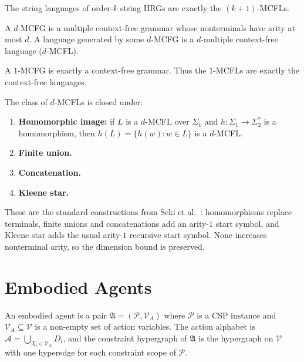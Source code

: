 \documentclass[runningheads]{llncs}
\begin{document}
\begin{theorem}\label{thm:hrg-mcfl}
The string languages of order-$k$ string HRGs are exactly the $(k{+}1)$-MCFLs.
\end{theorem}

\begin{definition}\label{def:dimension}
A $d$-MCFG is a multiple context-free grammar whose nonterminals have arity at most $d$. A language generated by some $d$-MCFG is a $d$-multiple context-free language ($d$-MCFL).
\end{definition}

\begin{remark}\label{rem:mcfg-cfg}
A $1$-MCFG is exactly a context-free grammar. Thus the $1$-MCFLs are exactly the context-free languages.
\end{remark}

\begin{lemma}\label{lem:mcfl-closure}
The class of $d$-MCFLs is closed under:
\begin{enumerate}[nosep,label=(\alph*)]
  \item\label{closure:hom} \textbf{Homomorphic image:} if $L$ is a $d$-MCFL over $\Sigma_1$ and $h\colon \Sigma_1 \to \Sigma_2^*$ is a homomorphism, then $h(L) = \{h(w) : w \in L\}$ is a $d$-MCFL.
  \item\label{closure:union} \textbf{Finite union.}
  \item\label{closure:concat} \textbf{Concatenation.}
  \item\label{closure:star} \textbf{Kleene star.}
\end{enumerate}
\end{lemma}

These are the standard constructions from Seki et al.~\cite{Seki91}: homomorphisms replace terminals, finite unions and concatenations add an arity-$1$ start symbol, and Kleene star adds the usual arity-$1$ recursive start symbol. None increases nonterminal arity, so the dimension bound is preserved.

\section{Embodied Agents}\label{sec:agent}

\begin{definition}\label{def:agent}
An embodied agent is a pair $\mathfrak{A} = (\mathcal{P}, \mathcal{V}_A)$ where $\mathcal{P}$ is a CSP instance and $\mathcal{V}_A \subseteq \mathcal{V}$ is a non-empty set of action variables. The action alphabet is $\mathcal{A} = \bigcup_{X_i \in \mathcal{V}_A} D_i$, and the constraint hypergraph of $\mathfrak{A}$ is the hypergraph on $\mathcal{V}$ with one hyperedge for each constraint scope of $\mathcal{P}$.
\end{definition}
\end{document}
